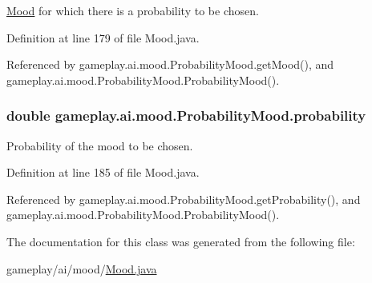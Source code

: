 \hyperlink{a00015}{Mood} for which there is a probability to be chosen. 



Definition at line 179 of file Mood.\-java.



Referenced by gameplay.\-ai.\-mood.\-Probability\-Mood.\-get\-Mood(), and gameplay.\-ai.\-mood.\-Probability\-Mood.\-Probability\-Mood().

\hypertarget{a00021_a44377e9c9418a71f5151439c58f7b555}{
\subsubsection[{probability}]{\setlength{\rightskip}{0pt plus 5cm}double gameplay.\-ai.\-mood.\-Probability\-Mood.\-probability\hspace{0.3cm}{\ttfamily [protected]}}}\label{a00021_a44377e9c9418a71f5151439c58f7b555}


Probability of the mood to be chosen. 



Definition at line 185 of file Mood.\-java.



Referenced by gameplay.\-ai.\-mood.\-Probability\-Mood.\-get\-Probability(), and gameplay.\-ai.\-mood.\-Probability\-Mood.\-Probability\-Mood().



The documentation for this class was generated from the following file\-:\begin{DoxyCompactItemize}
\item 
gameplay/ai/mood/\hyperlink{a00047}{Mood.\-java}\end{DoxyCompactItemize}
